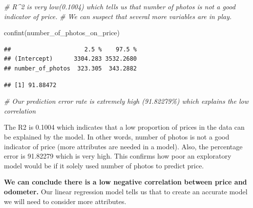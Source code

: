 \documentclass[
]{article}
\newenvironment{Shaded}{\begin{snugshade}}{\end{snugshade}}
\newcommand{\CommentTok}[1]{\textcolor[rgb]{0.56,0.35,0.01}{\textit{#1}}}
\newcommand{\DecValTok}[1]{\textcolor[rgb]{0.00,0.00,0.81}{#1}}
\newcommand{\FunctionTok}[1]{\textcolor[rgb]{0.00,0.00,0.00}{#1}}
\newcommand{\NormalTok}[1]{#1}
\newcommand{\SpecialCharTok}[1]{\textcolor[rgb]{0.00,0.00,0.00}{#1}}
\begin{document}
\begin{Shaded}
\begin{Highlighting}[]
\CommentTok{\# R\^{}2 is very low(0.1004) which tells us that number of photos is not a good indicator of price. }
\CommentTok{\# We can suspect that several more variables are in play.}

\FunctionTok{confint}\NormalTok{(number\_of\_photos\_on\_price)}
\end{Highlighting}
\end{Shaded}

\begin{verbatim}
##                     2.5 %    97.5 %
## (Intercept)      3304.283 3532.2680
## number_of_photos  323.305  343.2882
\end{verbatim}

\begin{Shaded}
\end{Shaded}

\begin{verbatim}
## [1] 91.88472
\end{verbatim}

\begin{Shaded}
\begin{Highlighting}[]
\CommentTok{\# Our prediction error rate is extremely high (91.82279\%) which explains the low correlation}
\end{Highlighting}
\end{Shaded}

The R2 is 0.1004 which indicates that a low proportion of prices in the
data can be explained by the model. In other words, number of photos is
not a good indicator of price (more attributes are needed in a model).
Also, the percentage error is 91.82279 which is very high. This confirms
how poor an exploratory model would be if it solely used number of
photos to predict price.

\textbf{We can conclude there is a low negative correlation between
price and odometer.} Our linear regression model tells us that to create
an accurate model we will need to consider more attributes.
\end{document}
